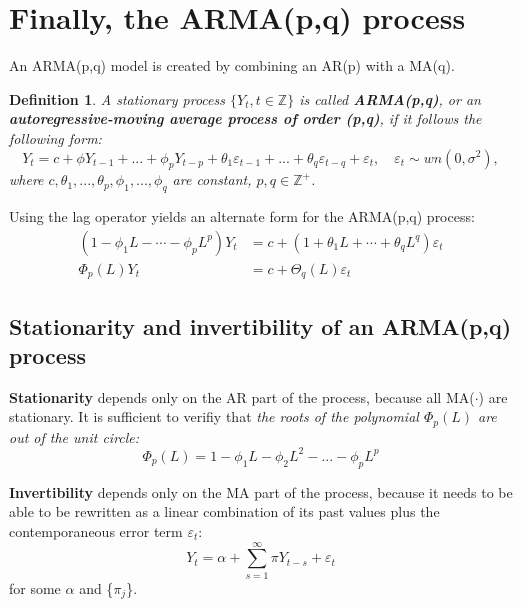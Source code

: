 \documentclass[11pt, a4paper]{report}
\theoremstyle{plain}
\theoremstyle{plain}
\newtheorem{defn}{Definition}[section]
\theoremstyle{remark}
\begin{document}
\section{Finally, the ARMA(p,q) process}

An ARMA(p,q) model is created by combining an AR(p) with a MA(q).

\begin{defn}
	A stationary process $\{Y_t, t \in \mathbb{Z} \}$ is called \textbf{ARMA(p,q)}, or an \textbf{autoregressive-moving average process of order (p,q)}, if it follows the following form:
	$$ Y_t = c + \phi Y_{t-1} + ... + \phi_p Y_{t-p} + \theta_1 \varepsilon_{t-1} + ... + \theta_q \varepsilon_{t-q} + \varepsilon_t, \hspace{1em} \varepsilon_t \sim wn(0, \sigma^2), $$
	where $c, \theta_1, ..., \theta_p, \phi_1, ..., \phi_q$ are constant, $p, q \in \mathbb{Z}^+$.
\end{defn}

Using the lag operator yields an alternate form for the ARMA(p,q) process:
$$\begin{aligned}
	\left(1-\phi_{1} L-\cdots-\phi_{p} L^{p}\right) Y_{t} &=c+\left(1+\theta_{1} L+\cdots+\theta_{q} L^{q}\right) \varepsilon_{t} \\
	\Phi_{p}(L) Y_{t} &=c+\Theta_{q}(L) \varepsilon_{t}
\end{aligned}$$

\subsection{Stationarity and invertibility of an ARMA(p,q) process}

\textbf{Stationarity} depends only on the AR part of the process, because all MA($\cdot$) are stationary. It is sufficient to verifiy that \textit{the roots of the polynomial $\Phi_p(L)$ are out of the unit circle:}
$$\Phi_p(L) = 1 - \phi_1 L - \phi_2 L^2 - ... - \phi_{p} L^p $$

\textbf{Invertibility} depends only on the MA part of the process, because it needs to be able to be rewritten as a linear combination of its past values plus the contemporaneous error term $\varepsilon_{t}$:
$$ Y_t = \alpha + \sum_{s=1}^{\infty} \pi Y_{t-s} + \varepsilon_{t} $$
for some $\alpha$ and \{$\pi_j$\}. 
\end{document}
